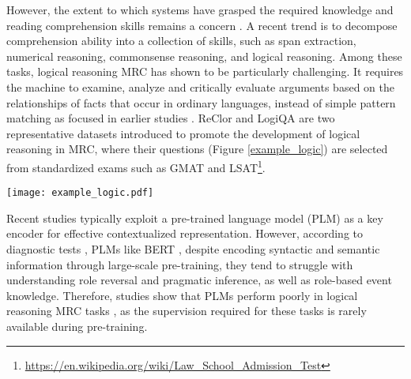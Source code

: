 \documentclass[11pt]{article}
\begin{document}
However, the extent to which systems have grasped the required knowledge and reading comprehension skills remains a concern \citep{sugawara2020assessing}. A recent trend is to decompose comprehension ability into a collection of skills, such as span extraction, numerical reasoning, commonsense reasoning, and logical reasoning. Among these tasks, logical reasoning MRC has shown to be particularly challenging. It requires the machine to examine, analyze and critically evaluate arguments based on the relationships of facts that occur in ordinary languages, instead of simple pattern matching as focused in earlier studies \citep{lai2021machine}. ReClor \cite{yu2020reclor} and LogiQA \cite{ijcai2020-0501} are two representative datasets introduced to promote the development of logical reasoning in MRC, where their questions (Figure \ref{example_logic}) are selected from standardized exams such as GMAT and LSAT\footnote{\url{https://en.wikipedia.org/wiki/Law_School_Admission_Test}}.

\begin{figure*}[htb]
\centering
\texttt{[image: example\_logic.pdf]}
\caption{Two examples from LogiQA and ReClor respectively are illustrated. There are arguments and relations between arguments. Both are emphasized by different colors: \textcolor{Blue}{arguments}, \textcolor{GoldNrod}{relations}. Keywords in questions are highlighted in \textcolor{Purple}{Purple}. Key options are highlighted in \textcolor{Gray}{gray}. }
\label{example_logic}
\end{figure*}

Recent studies typically exploit a pre-trained language model (PLM) as a key encoder for effective contextualized representation. However, according to diagnostic tests \citep{ettinger2020bert,rogers2020primer}, PLMs like BERT \citep{devlin-etal-2019-bert}, despite encoding syntactic and semantic information through large-scale pre-training, they tend to struggle with understanding role reversal and pragmatic inference, as well as role-based event knowledge. Therefore, studies show that PLMs perform poorly in logical reasoning MRC tasks \citep{yu2020reclor,ijcai2020-0501}, as the supervision required for these tasks is rarely available during pre-training.
\end{document}
